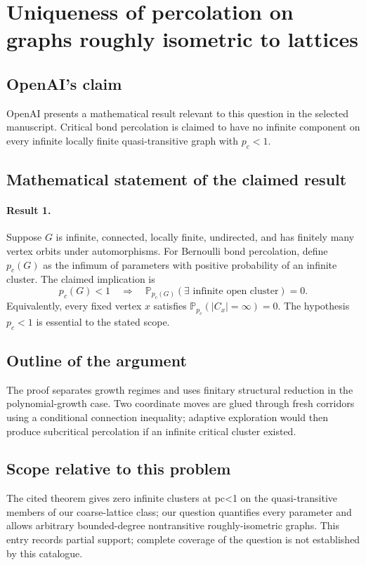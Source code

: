 \documentclass[11pt]{article}
\begin{document}
\section*{Uniqueness of percolation on graphs roughly isometric to lattices}

\subsection{OpenAI's claim}
OpenAI presents a mathematical result relevant to this question in the selected manuscript. Critical bond percolation is claimed to have no infinite component on every infinite locally finite quasi-transitive graph with $p_c<1$.

\subsection{Mathematical statement of the claimed result}
\paragraph{Result 1.} Suppose \(G\) is infinite, connected, locally finite, undirected, and has finitely many vertex orbits under automorphisms. For Bernoulli bond percolation, define \(p_c(G)\) as the infimum of parameters with positive probability of an infinite cluster. The claimed implication is
\[
 p_c(G)<1\quad\Longrightarrow\quad
 \mathbb P_{p_c(G)}(\exists\text{ infinite open cluster})=0.
\]
Equivalently, every fixed vertex \(x\) satisfies \(\mathbb P_{p_c}(|C_x|=\infty)=0\). The hypothesis \(p_c<1\) is essential to the stated scope.

\subsection{Outline of the argument}
The proof separates growth regimes and uses finitary structural reduction in the polynomial-growth case. Two coordinate moves are glued through fresh corridors using a conditional connection inequality; adaptive exploration would then produce subcritical percolation if an infinite critical cluster existed.

\subsection{Scope relative to this problem}
The cited theorem gives zero infinite clusters at pc<1 on the quasi-transitive members of our coarse-lattice class; our question quantifies every parameter and allows arbitrary bounded-degree nontransitive roughly-isometric graphs. This entry records partial support; complete coverage of the question is not established by this catalogue.
\end{document}
